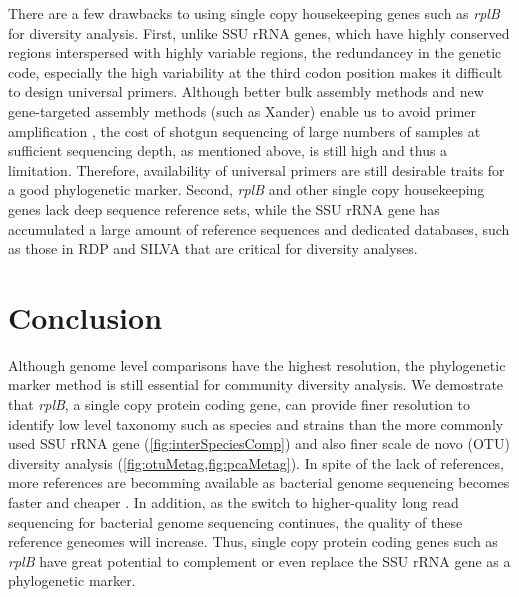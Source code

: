 \documentclass[]{msu-thesis}
\begin{document}
There are a few drawbacks to using single copy housekeeping genes such as \textit{rplB} for diversity analysis. First, unlike SSU rRNA genes, which have highly conserved regions interspersed with highly variable regions, the redundancey in the genetic code, especially the high variability  at the third codon position makes it difficult to design universal primers. Although better bulk assembly methods and new gene-targeted assembly methods (such as Xander) enable us to avoid primer amplification \cite{guo_microbial_2015,wang_xander:_2015,miller_short-read_2013}, the cost of shotgun sequencing of large numbers of samples at sufficient sequencing depth, as mentioned above, is still high and thus a limitation. Therefore, availability of universal primers are still desirable traits for a good phylogenetic marker. Second, \textit{rplB} and other single copy housekeeping genes lack deep sequence reference sets, while the SSU rRNA gene has accumulated a large amount of reference sequences and dedicated databases, such as  those in RDP and SILVA \cite{cole_ribosomal_2014,quast_silva_2013} that are critical for diversity analyses.


\section{Conclusion}

Although genome level comparisons have the highest resolution, the phylogenetic marker method is still essential for community diversity analysis. We demostrate that \textit{rplB}, a single copy protein coding gene, can provide finer resolution to identify low level taxonomy such as species and strains than the more commonly used SSU rRNA gene (\cref{fig:interSpeciesComp}) and also finer scale de novo (OTU) diversity analysis (\cref{fig:otuMetag,fig:pcaMetag}). In spite of the lack of references, more references are becomming available as bacterial genome sequencing becomes faster and cheaper \cite{land_insights_2015}. In addition, as the switch to higher-quality long read sequencing for bacterial genome sequencing continues, the quality of these reference geneomes will increase. Thus, single copy protein coding genes such as \textit{rplB} have great potential to complement or even replace the SSU rRNA gene as a phylogenetic marker.
\end{document}
